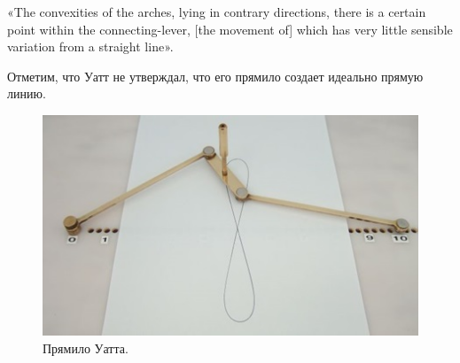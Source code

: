 «The convexities of the arches, lying in contrary directions, there is a certain point within the connecting-lever, [the movement of] which has very little sensible variation from a straight line».

Отметим, что Уатт не утверждал, что его прямило создает идеально прямую линию.

\begin{figure}[h!]
	\begin{center}
		\includegraphics[width=1\linewidth]{chapters/chapter22/images/2}
		\caption{Прямило Уатта.}
		\label{ris:image22x2}
	\end{center}
\end{figure}

